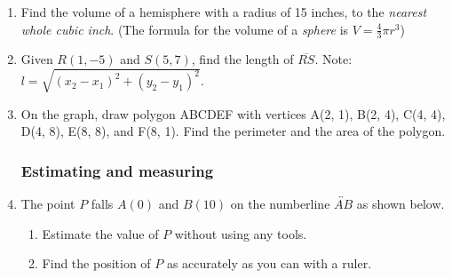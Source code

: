 \documentclass[12pt, twoside]{article}
\begin{document}
\begin{enumerate}
\newpage
\item Find the volume of a hemisphere with a radius of 15 inches, to the \emph{nearest whole cubic inch}. (The formula for the volume of a \emph{sphere} is $V=\frac{4}{3}\pi r^3$) \vspace{5cm}

\item Given $R(1,-5)$ and $S(5,7)$, find the length of $\overline{RS}$. Note: $l=\sqrt{(x_2-x_1)^2+(y_2-y_1)^2}$. \vspace{4cm}

\item On the graph, draw polygon ABCDEF with vertices A(2, 1), B(2, 4), C(4, 4), D(4, 8), E(8, 8), and F(8, 1). Find the perimeter and the area of the polygon.\\[1cm]
  \vspace{2cm}

\newpage
\subsubsection*{Estimating and measuring}
\item The point $P$ falls $A(0)$ and $B(10)$ on the numberline $\overleftrightarrow{AB}$ as shown below. \\[15pt] %
  \begin{enumerate}
    \item Estimate the value of $P$ without using any tools. \vspace{1cm} 
    \item Find the position of $P$ as accurately as you can with a ruler. 
  \end{enumerate} \vspace{1cm} 


\end{enumerate}
\end{document}
